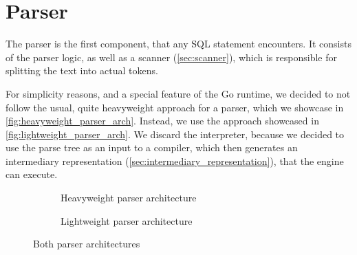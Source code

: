 \section{Parser}
\label{sec:parser}
The parser is the first component, that any SQL statement encounters.
It consists of the parser logic, as well as a scanner (\autoref{sec:scanner}), which is responsible for splitting the text into actual tokens.

For simplicity reasons, and a special feature of the Go runtime, we decided to not follow the usual, quite heavyweight approach for a parser, which we showcase in \autoref{fig:heavyweight_parser_arch}.
Instead, we use the approach showcased in \autoref{fig:lightweight_parser_arch}.
We discard the interpreter, because we decided to use the parse tree as an input to a compiler, which then generates an intermediary representation (\autoref{sec:intermediary_representation}), that the engine can execute.

\begin{figure}
    \centering
    \begin{subfigure}{.5\textwidth}
        \centering
        \caption{Heavyweight parser architecture}
        \label{fig:heavyweight_parser_arch}
    \end{subfigure}%
    \begin{subfigure}{.5\textwidth}
        \centering
        \caption{Lightweight parser architecture}
        \label{fig:lightweight_parser_arch}
    \end{subfigure}
    \caption{Both parser architectures}
    \label{fig:parser_archs}
\end{figure}

